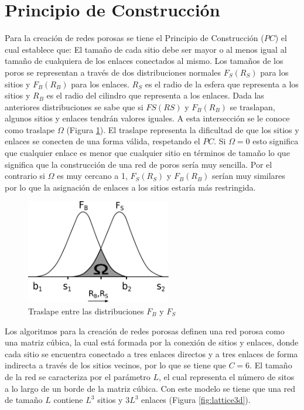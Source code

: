 \section{Principio de Construcción}
Para la creación de redes porosas se tiene el Principio de Construcción ($PC$) el cual establece que: El tamaño de cada sitio debe ser mayor o al menos igual al tamaño de cualquiera de los enlaces conectados al mismo. Los tamaños de los poros se representan a través de dos distribuciones normales $F_S(R_S)$ para los sitios y $F_B(R_B)$ para los enlaces. $R_S$ es el radio de la esfera que representa a los sitios y $R_B$ es el radio del cilindro que representa a los enlaces. Dada las anteriores distribuciones se sabe que si $FS(RS)$ y $F_B(R_B)$ se traslapan, algunos sitios y enlaces tendrán valores iguales. A esta intersección se le conoce como traslape $\Omega$ (Figura \ref{fig:overlap}). El traslape representa la dificultad de que los sitios y enlaces se conecten de una forma válida, respetando el $PC$. Si $\Omega=0$ esto significa que cualquier enlace es menor que cualquier sitio en términos de tamaño lo que significa que la construcción de una red de poros sería muy sencilla. Por el contrario si $\Omega$ es muy cercano a 1, $F_S(R_S)$ y $F_B(R_B)$ serían muy similares por lo que la asignación de enlaces a los sitios estaría más restringida.\\


\begin{figure}[hbtp]
\centering
\includegraphics[width=2.5in]{img/traslape.pdf}
\caption{Traslape entre las distribuciones \textit{$F_B$} y $F_S$}
\label{fig:overlap}
\end{figure}

Los algoritmos para la creación de redes porosas definen una red porosa como una matriz cúbica, la cual está formada por la conexión de sitios y enlaces, donde cada sitio se encuentra conectado a tres enlaces directos y a tres enlaces de forma indirecta a través de los sitios vecinos, por lo que se tiene que $C=6$. El tamaño de la red se caracteriza por el parámetro $L$, el cual representa el número de sitos a lo largo de un borde de la matriz cúbica. Con este modelo se tiene que una red de tamaño $L$ contiene $L^3$ sitios y $3L^3$ enlaces (Figura \ref{fig:lattice3d}).

